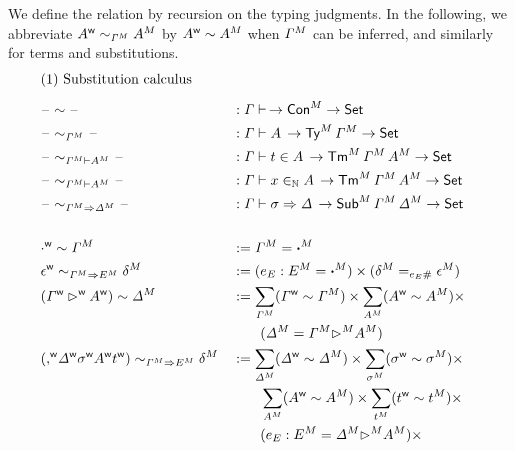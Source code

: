 We define the relation by recursion on the typing judgments.
In the following, we abbreviate ${A}^{\mathsf{w}} \sim_{{\mathit{\Gamma}}^M} {A}^M$ by
${A}^{\mathsf{w}}\sim{A}^M$ when ${\mathit{\Gamma}}^M$ can be inferred, and similarly for
terms and substitutions.
\begin{alignat*}{5}
  & \rlap{(1) Substitution calculus} \\[0.5em]
  & \blank \sim{ \blank} && :  \GG \vdash \, \ra \model{\Con} \ra \Set \\
  & \relT{\blank}{\model{\GG}}{\blank} && :  \GG \vdash A \, \ra \model{\Ty}\,\model{\GG} \ra \Set \\
  & \relt{\blank}{\model{\GG}}{\model{A}}{\blank} && :  \GG \vdash t \in A \, \ra \model{\Tm}\,\model{\GG}\,\model{A} \ra \Set \\
  & \relV{\blank}{\model{\GG}}{\model{A}}{\blank}&& :  \GG \vdash x \invar A \, \ra \model{\Tm}\,\model{\GG}\,\model{A} \ra \Set \\
  & \relS{\blank}{\model{\GG}}{\model{\GD}}{ \blank} && :  \GG \vdash \sigma \Rightarrow \GD \, \ra \model{\Sub}\,\model{\GG}\,\model{\GD} \ra \Set \\
  \\
  & \emptyw\sim \model{\GG} && := \model{\GG}=\model{\boldsymbol{\cdot}} \\
  & \relS{\epsilonw}{\model{\GG}}{\model{E}}{\model{\delta}}
  &&
 := (e_E : \model{E} = \model{\boldsymbol{\cdot}})\times (\model{\delta} = _{e_E \#}
 \model{\epsilon})
  \\
  & (\wf{\GG}\extw \wf{A})\sim \model{\GD} &&
   :=
    \sum_{\model{\GG}} (\wf{\GG}\sim\model{\GG}) \times
    \sum_{\model{A}} (\wf{A}\sim\model{A}) \times
    \\
    & && \qquad
    (\model{\GD} = \model{\GG} \model{\ext} \model{A})
    \\
    &
    \relS{(\consw\wf{\GD}\wf{\sigma}\wf{A}\wf{t})}{\model{\GG}}{\model{E}}{\model{\delta}}
    &&
   :=
    \sum_{\model{\GD}} (\wf{\GD}\sim\model{\GD}) \times
    \sum_{\model{\sigma}} (\wf{\sigma}\sim\model{\sigma}) \times
    \\
    & && \qquad
    \sum_{\model{A}} (\wf{A}\sim\model{A}) \times
    \sum_{\model{t}} (\wf{t}\sim\model{t}) \times
    \\
    & && \qquad
    (e_E : \model{E} = \model{\GD} \model{\ext} \model{A}) \times

\end{alignat*}
